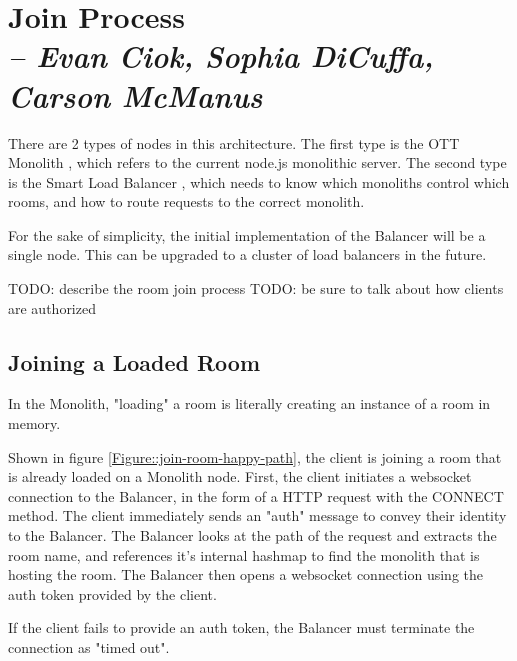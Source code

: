 \chapter{Join Process \\
  \small{\textit{-- Evan Ciok, Sophia DiCuffa, Carson McManus}}
  \label{Chapter::JoinProcess}}

There are 2 types of nodes in this architecture. The first type is the OTT Monolith , which refers to the current node.js monolithic server. The second type is the Smart Load Balancer , which needs to know which monoliths control which rooms, and how to route requests to the correct monolith.

For the sake of simplicity, the initial implementation of the Balancer will be a single node. This can be upgraded to a cluster of load balancers in the future.


TODO: describe the room join process
TODO: be sure to talk about how clients are authorized

\section{Joining a Loaded Room }

In the Monolith, "loading" a room is literally creating an instance of a room in memory.

Shown in figure \ref{Figure::join-room-happy-path}, the client is joining a room that is already loaded on a Monolith node. First, the client initiates a websocket  connection to the Balancer, in the form of a HTTP request with the CONNECT method. The client immediately sends an "auth" message to convey their identity to the Balancer. The Balancer looks at the path of the request and extracts the room name, and references it's internal hashmap to find the monolith that is hosting the room. The Balancer then opens a websocket connection using the auth token provided by the client.

If the client fails to provide an auth token, the Balancer must terminate the connection as "timed out".

